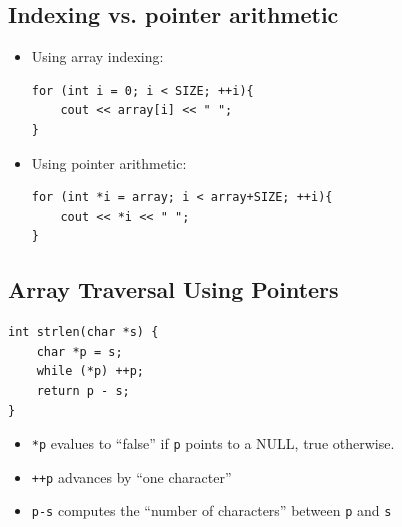 \subsection{Indexing vs. pointer arithmetic}
\begin{itemize}
	\item Using array indexing:
\begin{lstlisting}[style=C++]
for (int i = 0; i < SIZE; ++i){
	cout << array[i] << " ";
}
\end{lstlisting}
	\item Using pointer arithmetic:
\begin{lstlisting}[style=C++]
for (int *i = array; i < array+SIZE; ++i){
	cout << *i << " ";
}
\end{lstlisting}
\end{itemize}

\subsection{Array Traversal Using Pointers}
\begin{lstlisting}[style=C++]
int strlen(char *s) {
	char *p = s;
	while (*p) ++p;
	return p - s;
}
\end{lstlisting}
\begin{itemize}
	\item \lstinline[style=C++]{*p} evalues to ``false'' if \lstinline[style=C++]{p} points to a NULL, true otherwise.
	\item \lstinline[style=C++]{++p} advances by ``one character''
	\item \lstinline[style=C++]{p-s} computes the ``number of characters'' between \lstinline[style=C++]{p} and \lstinline[style=C++]{s}
\end{itemize}

